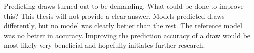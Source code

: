 Predicting draws turned out to be demanding. What could be done to improve this? This thesis will not provide a clear answer. Models predicted draws differently, but no model was clearly better than the rest. The reference model was no better in accuracy. Improving the prediction accuracy of a draw would be most likely very beneficial and hopefully initiates further research.
